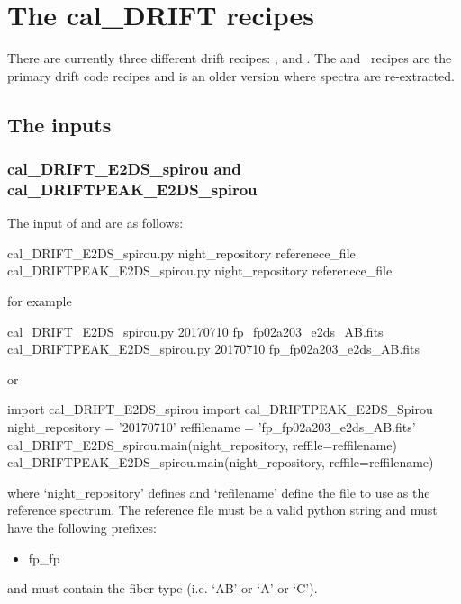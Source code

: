 \clearpage
\newpage
\section{The cal\_DRIFT recipes}
\label{ch:the_recipes:cal_DRIFT_RAW_spirou}

There are currently three different drift recipes: \calDRIFTRAW, \calDRIFTE and \calDRIFTPEAK. The \calDRIFTE and \calDRIFTPEAK\, recipes are the primary drift code recipes and \calDRIFTRAW is an older version where spectra are re-extracted.

\subsection{The inputs}

\subsubsection{cal\_DRIFT\_E2DS\_spirou and cal\_DRIFTPEAK\_E2DS\_spirou}

The input of \calDRIFTE and \calDRIFTPEAK are as follows:
\begin{cmdbox}
cal_DRIFT_E2DS_spirou.py night_repository referenece_file
cal_DRIFTPEAK_E2DS_spirou.py night_repository referenece_file
\end{cmdbox}
\noindent for example
\begin{cmdbox}[title={example}]
cal_DRIFT_E2DS_spirou.py 20170710 fp_fp02a203_e2ds_AB.fits
cal_DRIFTPEAK_E2DS_spirou.py 20170710 fp_fp02a203_e2ds_AB.fits
\end{cmdbox}
\noindent or
\begin{pythonbox}
import cal_DRIFT_E2DS_spirou
import cal_DRIFTPEAK_E2DS_Spirou
night_repository = '20170710'
reffilename = 'fp_fp02a203_e2ds_AB.fits'
cal_DRIFT_E2DS_spirou.main(night_repository, reffile=reffilename)
cal_DRIFTPEAK_E2DS_spirou.main(night_repository, reffile=reffilename)
\end{pythonbox}

\noindent where `night\_repository' defines \argnightname and `refilename' define the file to use as the reference spectrum. The reference file must be a valid python string and must have the following prefixes:
\begin{itemize}
	\item fp\_fp
\end{itemize}
\noindent and must contain the fiber type (i.e. `AB' or `A' or `C').

